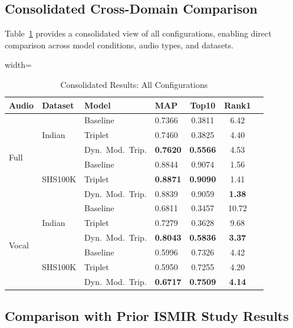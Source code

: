 \documentclass[conference]{IEEEtran}
\begin{document}
\subsection{Consolidated Cross-Domain Comparison}

Table~\ref{tab:consolidated} provides a consolidated view of all configurations, enabling direct comparison across model conditions, audio types, and datasets.

\begin{table}[htbp]
    \caption{Consolidated Results: All Configurations}
    \label{tab:consolidated}
    \centering
    \begin{adjustbox}{width=\columnwidth}
    \begin{tabular}{llllccc}
    \toprule
    \textbf{Audio} & \textbf{Dataset} & \textbf{Model} & \textbf{MAP} & \textbf{Top10} & \textbf{Rank1} \\
    \midrule
    \multirow{6}{*}{Full}
    & \multirow{3}{*}{Indian}
    & Baseline       & 0.7366 & 0.3811 & 6.42 \\
    & & Triplet        & 0.7460 & 0.3825 & 4.40 \\
    & & Dyn.\ Mod.\ Trip. & \textbf{0.7620} & \textbf{0.5566} & 4.53 \\
    \cmidrule{2-6}
    & \multirow{3}{*}{SHS100K}
    & Baseline       & 0.8844 & 0.9074 & 1.56 \\
    & & Triplet        & \textbf{0.8871} & \textbf{0.9090} & 1.41 \\
    & & Dyn.\ Mod.\ Trip. & 0.8839 & 0.9059 & \textbf{1.38} \\
    \midrule
    \multirow{6}{*}{Vocal}
    & \multirow{3}{*}{Indian}
    & Baseline       & 0.6811 & 0.3457 & 10.72 \\
    & & Triplet        & 0.7279 & 0.3628 & 9.68 \\
    & & Dyn.\ Mod.\ Trip. & \textbf{0.8043} & \textbf{0.5836} & \textbf{3.37} \\
    \cmidrule{2-6}
    & \multirow{3}{*}{SHS100K}
    & Baseline       & 0.5996 & 0.7326 & 4.42 \\
    & & Triplet        & 0.5950 & 0.7255 & 4.20 \\
    & & Dyn.\ Mod.\ Trip. & \textbf{0.6717} & \textbf{0.7509} & \textbf{4.14} \\
    \bottomrule
    \end{tabular}
    \end{adjustbox}
\end{table}

\subsection{Comparison with Prior ISMIR Study Results}
\end{document}
